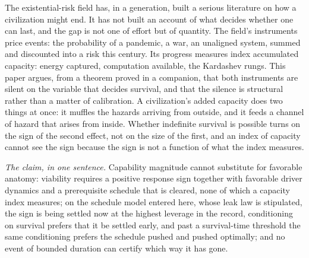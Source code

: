\documentclass[11pt]{article}
\theoremstyle{plain}
\theoremstyle{definition}
\theoremstyle{remark}
\begin{document}
The existential-risk field has, in a generation, built a serious
literature on how a civilization might end. It has not built an account
of what decides whether one can last, and the gap is not one of effort
but of quantity. The field's instruments price events: the probability
of a pandemic, a war, an unaligned system, summed and discounted into a
risk this century. Its progress measures index accumulated capacity:
energy captured, computation available, the Kardashev rungs. This paper
argues, from a theorem proved in a companion, that both instruments are
silent on the variable that decides survival, and that the silence is
structural rather than a matter of calibration. A civilization's added
capacity does two things at once: it muffles the hazards arriving from
outside, and it feeds a channel of hazard that arises from inside.
Whether indefinite survival is possible turns on the sign of the second
effect, not on the size of the first, and an index of capacity cannot
see the sign because the sign is not a function of what the index
measures.

\emph{The claim, in one sentence.} Capability magnitude cannot
substitute for favorable anatomy: viability requires a positive response
sign together with favorable driver dynamics and a prerequisite
schedule that is cleared, none of which a capacity index measures; on
the schedule model entered here, whose leak law is stipulated, the sign
is being settled now at the highest leverage in the record, conditioning
on survival prefers that it be settled early, and past a survival-time
threshold the same conditioning prefers the schedule pushed and pushed
optimally; and no event of bounded duration can certify which way it
has gone.
\end{document}
